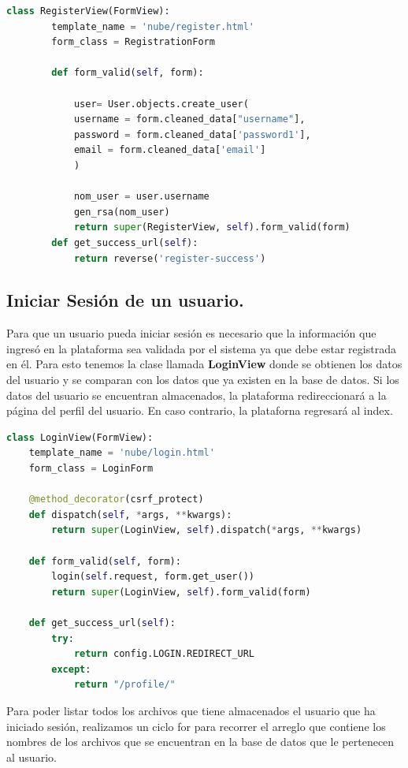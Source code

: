 \begin{lstlisting}[language=Python,frame=single, keywordstyle=\color{blue},breaklines=true]
	class RegisterView(FormView):
		template_name = 'nube/register.html'
		form_class = RegistrationForm

		def form_valid(self, form):

			user= User.objects.create_user(
			username = form.cleaned_data["username"],
			password = form.cleaned_data['password1'],
			email = form.cleaned_data['email']
			)

			nom_user = user.username
			gen_rsa(nom_user)
			return super(RegisterView, self).form_valid(form)
		def get_success_url(self):
			return reverse('register-success')
\end{lstlisting}

\subsection{Iniciar Sesión de un usuario.} 
Para que un usuario pueda iniciar sesión es necesario que la información que ingresó en la plataforma sea validada por el sistema ya que debe estar registrada en él.
Para esto tenemos la clase llamada \textbf{LoginView} donde se obtienen los datos del usuario y se comparan con los datos que ya existen en la base de datos. Si los datos del usuario se encuentran almacenados, la plataforma redireccionará a la página del perfil del usuario. En caso contrario, la plataforna regresará al index.

\begin{lstlisting}[language=Python,frame=single, keywordstyle=\color{blue},breaklines=true]
class LoginView(FormView):
	template_name = 'nube/login.html'
	form_class = LoginForm

	@method_decorator(csrf_protect)
	def dispatch(self, *args, **kwargs):
		return super(LoginView, self).dispatch(*args, **kwargs)

	def form_valid(self, form):
		login(self.request, form.get_user())
		return super(LoginView, self).form_valid(form)

	def get_success_url(self):
		try:
			return config.LOGIN.REDIRECT_URL
		except:
			return "/profile/"

\end{lstlisting}

Para poder listar todos los archivos que tiene almacenados el usuario que ha iniciado sesión, realizamos un ciclo for para recorrer el arreglo que contiene los nombres de los archivos que se encuentran en la base de datos que le pertenecen al usuario.


